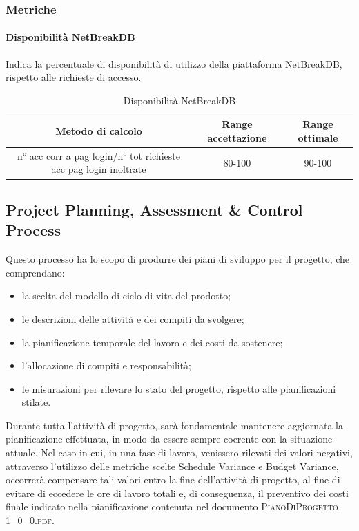 		\subsubsection{Metriche}
			\paragraph{Disponibilità NetBreakDB}
			Indica la percentuale di disponibilità di utilizzo della piattaforma NetBreakDB, rispetto alle richieste di accesso.
			\begin{table}[H]
				\begin{center}
					\begin{tabular}{|c|c|c|}
						\hline
						\textbf{Metodo di calcolo} & \textbf{Range accettazione} & \textbf{Range ottimale} \\
						\hline
						n° acc corr	a pag login/n° tot richieste acc pag login inoltrate & 80-100  & 90-100 \\
						\hline
					\end{tabular}
				\end{center}
				\caption{Disponibilità NetBreakDB}
			\end{table}
	
	\subsection{Project Planning, Assessment \& Control Process}
	Questo processo ha lo scopo di produrre dei piani di sviluppo per il progetto, che comprendano:
	\begin{itemize}
		\item la scelta del modello di ciclo di vita del prodotto;
		\item le descrizioni delle attività e dei compiti da svolgere;
		\item la pianificazione temporale del lavoro e dei costi da sostenere;
		\item l'allocazione di compiti e responsabilità;
		\item le misurazioni per rilevare lo stato del progetto, rispetto alle pianificazioni stilate.
	\end{itemize}
	Durante tutta l’attività di	progetto, sarà fondamentale mantenere aggiornata la pianificazione effettuata, in modo da essere sempre coerente con la situazione attuale. Nel caso in cui, in una fase di lavoro, venissero rilevati dei valori negativi, attraverso l'utilizzo delle metriche scelte Schedule Variance e Budget Variance, occorrerà compensare tali valori entro la fine dell’attività di progetto, al fine di evitare di eccedere le ore di lavoro totali e, di conseguenza, il preventivo dei costi finale indicato nella pianificazione contenuta nel documento \textsc{PianoDiProgetto 1\_0\_0.pdf}.
